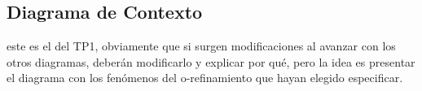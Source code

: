 \subsection{Diagrama de Contexto}

este es el del TP1, obviamente que si surgen modificaciones al avanzar con los otros diagramas, deberán modificarlo y explicar por qué, pero la idea es presentar el diagrama con los fenómenos del o-refinamiento que hayan elegido especificar.